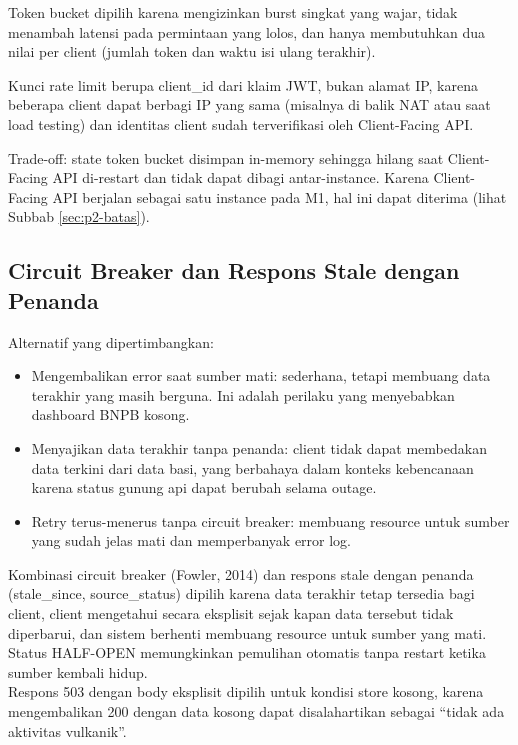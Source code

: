 Token bucket dipilih karena mengizinkan burst singkat yang wajar, tidak menambah latensi pada permintaan yang lolos, dan hanya membutuhkan dua nilai per client (jumlah token dan waktu isi ulang terakhir).

Kunci rate limit berupa client\_id dari klaim JWT, bukan alamat IP, karena beberapa client dapat berbagi IP yang sama (misalnya di balik NAT atau saat load testing) dan identitas client sudah terverifikasi oleh Client-Facing API.

Trade-off: state token bucket disimpan in-memory sehingga hilang saat Client-Facing API di-restart dan tidak dapat dibagi antar-instance. Karena Client-Facing API berjalan sebagai satu instance pada M1, hal ini dapat diterima (lihat Subbab \ref{sec:p2-batas}).

\subsection{Circuit Breaker dan Respons Stale dengan Penanda}

Alternatif yang dipertimbangkan:

\begin{itemize}
\tightlist
\item
  Mengembalikan error saat sumber mati: sederhana, tetapi membuang data terakhir yang masih berguna. Ini adalah perilaku yang menyebabkan dashboard BNPB kosong.\\
\item
  Menyajikan data terakhir tanpa penanda: client tidak dapat membedakan data terkini dari data basi, yang berbahaya dalam konteks kebencanaan karena status gunung api dapat berubah selama outage.\\
\item
  Retry terus-menerus tanpa circuit breaker: membuang resource untuk sumber yang sudah jelas mati dan memperbanyak error log.
\end{itemize}

Kombinasi circuit breaker (Fowler, 2014) dan respons stale dengan penanda (stale\_since, source\_status) dipilih karena data terakhir tetap tersedia bagi client, client mengetahui secara eksplisit sejak kapan data tersebut tidak diperbarui, dan sistem berhenti membuang resource untuk sumber yang mati. Status HALF-OPEN memungkinkan pemulihan otomatis tanpa restart ketika sumber kembali hidup.\\
Respons 503 dengan body eksplisit dipilih untuk kondisi store kosong, karena mengembalikan 200 dengan data kosong dapat disalahartikan sebagai ``tidak ada aktivitas vulkanik''.

